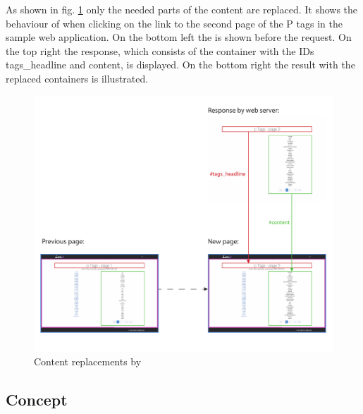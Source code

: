 \noindent{}As shown in fig. \ref{fig:lare_replacements} only the needed parts of the content are replaced.
It shows the behaviour of \lare{} when clicking on the link to the second page of the P tags in the sample web application.
On the bottom left the \webPage{} is shown before the request.
On the top right the response, which consists of the container with the IDs tags\_headline and content, is displayed.
On the bottom right the result with the replaced containers is illustrated.
\newpage{}
\begin{figure}[H]
\centering
\includegraphics[width=14cm]{images/lare_replacements.pdf}
\caption[lare_replacements]{Content replacements by \lare{}}
\label{fig:lare_replacements}
\end{figure}

\subsection{Concept\label{sec:lare_concept}}

